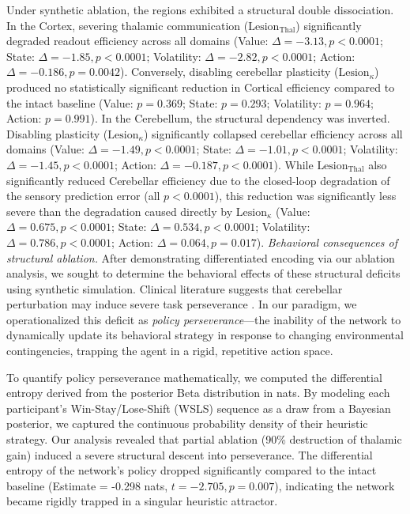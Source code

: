 \documentclass[12pt, a4paper]{extarticle}
\begin{document}
	Under synthetic ablation, the regions exhibited a structural double dissociation. In the Cortex, severing thalamic communication ($\text{Lesion}_{\text{Thal}}$) significantly degraded readout efficiency across all domains (Value: $\Delta = -3.13, p < 0.0001$; State: $\Delta = -1.85, p < 0.0001$; Volatility: $\Delta = -2.82, p < 0.0001$; Action: $\Delta = -0.186, p = 0.0042$). Conversely, disabling cerebellar plasticity ($\text{Lesion}_{\kappa}$) produced no statistically significant reduction in Cortical efficiency compared to the intact baseline (Value: $p = 0.369$; State: $p = 0.293$; Volatility: $p = 0.964$; Action: $p = 0.991$).
	In the Cerebellum, the structural dependency was inverted. Disabling plasticity ($\text{Lesion}_{\kappa}$) significantly collapsed cerebellar efficiency across all domains (Value: $\Delta = -1.49, p < 0.0001$; State: $\Delta = -1.01, p < 0.0001$; Volatility: $\Delta = -1.45, p < 0.0001$; Action: $\Delta = -0.187, p < 0.0001$). While $\text{Lesion}_{\text{Thal}}$ also significantly reduced Cerebellar efficiency due to the closed-loop degradation of the sensory prediction error (all $p < 0.0001$), this reduction was significantly less severe than the degradation caused directly by $\text{Lesion}_{\kappa}$ (Value: $\Delta = 0.675, p < 0.0001$; State: $\Delta = 0.534, p < 0.0001$; Volatility: $\Delta = 0.786, p < 0.0001$; Action: $\Delta = 0.064, p = 0.017$).
	\textit{Behavioral consequences of structural ablation.}
	After demonstrating differentiated encoding via our ablation analysis, we sought to determine the behavioral effects of these structural deficits using synthetic simulation. Clinical literature suggests that cerebellar perturbation may induce severe task perseverance \parencite{schmahmannDysmetriaThoughtClinical1998a}. In our paradigm, we operationalized this deficit as \textit{policy perseverance}---the inability of the network to dynamically update its behavioral strategy in response to changing environmental contingencies, trapping the agent in a rigid, repetitive action space.
	
	To quantify policy perseverance mathematically, we computed the differential entropy derived from the posterior Beta distribution in nats. By modeling each participant's Win-Stay/Lose-Shift (WSLS) sequence as a draw from a Bayesian posterior, we captured the continuous probability density of their heuristic strategy. Our analysis revealed that partial ablation (90\% destruction of thalamic gain) induced a severe structural descent into perseverance. The differential entropy of the network's policy dropped significantly compared to the intact baseline (Estimate = -0.298 nats, $t = -2.705, p = 0.007$), indicating the network became rigidly trapped in a singular heuristic attractor. 
	
\end{document}
